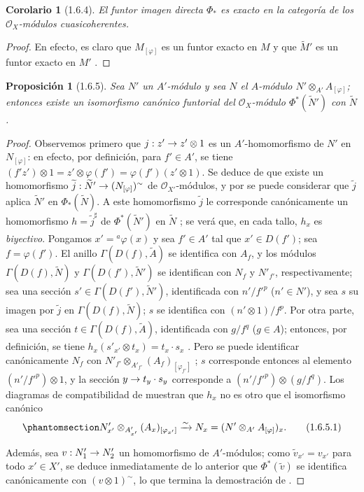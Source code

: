 \documentclass[oneside]{amsart}
\theoremstyle{ega-env-style}
\theoremstyle{ega-thm-env-style}
\newtheorem*{proposition}{Proposición}
\newtheorem*{corollary}{Corolario}
\theoremstyle{ega-defn-env-style}
\renewcommand{\to}{\mathchoice{\longrightarrow}{\rightarrow}{\rightarrow}{\rightarrow}}
\let\EGAOriginalLabel\label
\renewcommand{\label}[1]{\phantomsection\EGAOriginalLabel{#1}}
\begin{document}
\begin{corollary}[1.6.4]
\label{I.1.6.4}
El funtor imagen directa $\Phi_*$ es exacto en la categoría de los $\mathscr{O}_X$-módulos cuasicoherentes.
\end{corollary}

\begin{proof}
En efecto, es claro que $M_{[\varphi]}$ es un funtor exacto en $M$ y que $\widetilde{M}'$ es un
funtor exacto en $M'$ .
\end{proof}

\begin{proposition}[1.6.5]
\label{I.1.6.5}
Sea $N'$ un $A'$-módulo y sea $N$ el $A$-módulo $N'\otimes_{A'}A_{[\varphi]}$;
entonces existe un isomorfismo canónico funtorial del $\mathscr{O}_X$-módulo $\Phi^*(\widetilde{N}')$ con $\widetilde{N}$.
\end{proposition}

\begin{proof}
Observemos primero que $j:z'\to z'\otimes 1$ es un $A'$-homomorfismo de $N'$ en $N_{[\varphi]}$: en efecto, por definición, para $f'\in A'$, se tiene $(f'z')\otimes 1=z'\otimes\varphi(f')=\varphi(f')(z'\otimes 1)$.
Se deduce de  que existe un homomorfismo $\widetilde{j}:\widetilde{N}'\to(N_{[\varphi]})^{\sim}$ de $\mathscr{O}_{X'}$-módulos, y por  se puede considerar que $\widetilde{j}$ aplica $\widetilde{N}'$ en $\Phi_*(\widetilde{N})$.
A este homomorfismo $\widetilde{j}$ le corresponde canónicamente un homomorfismo $h=\widetilde{j}^{\sharp}$ de $\Phi^*(\widetilde{N}')$ en $\widetilde{N}$ ;
se verá que, en cada tallo, $h_x$ es \emph{biyectivo}.
Pongamos $x'={}^a\varphi(x)$ y sea $f'\in A'$ tal que $x'\in D(f')$;
sea $f=\varphi(f')$.
El anillo $\Gamma(D(f),\widetilde{A})$ se identifica con $A_f$, y los módulos
$\Gamma(D(f),\widetilde{N})$ y $\Gamma(D(f'),\widetilde{N}')$ se identifican con $N_f$ y $N'_{f'}$, respectivamente;
sea una sección $s'\in\Gamma(D(f'),\widetilde{N}')$, identificada con $n'/{f'}^p$ ($n'\in N'$), y sea $s$ su imagen por $\widetilde{j}$ en $\Gamma(D(f),\widetilde{N})$;
$s$ se identifica con $(n'\otimes 1)/f^p$.
Por otra parte, sea una sección $t\in\Gamma(D(f),\widetilde{A})$, identificada con $g/f^q$ ($g\in A$);
entonces, por definición, se tiene $h_x(s'_{x'}\otimes t_x)=t_x\cdot s_x$ .
Pero se puede identificar canónicamente $N_f$ con $N'_{f'}\otimes_{A'_{f'}}(A_f)_{[\varphi_{f'}]}$ ;
$s$ corresponde entonces al elemento $(n'/{f'}^p)\otimes 1$, y la sección $y\to t_y\cdot s_y$ corresponde a $(n'/{f'}^p)\otimes(g/f^q)$.
Los diagramas de compatibilidad de  muestran que $h_x$ no es otro que el isomorfismo canónico
\[
  \label{I.1.6.5.1-fr}
  N'_{x'}\otimes_{A'_{x'}}(A_x)_{[\varphi_{x'}]}
  \xrightarrow{\sim}N_x=(N'\otimes_{A'}A_{[\varphi]})_x.
  \tag{1.6.5.1}
\]

Además, sea $v:N'_1\to N'_2$ un homomorfismo de $A'$-módulos;
como $\widetilde{v}_{x'}=v_{x'}$ para todo $x'\in X'$, se deduce inmediatamente de lo anterior que $\Phi^*(\widetilde{v})$ se identifica canónicamente con $(v\otimes 1)^{\sim}$, lo que termina la demostración de .
\end{proof}
\end{document}
